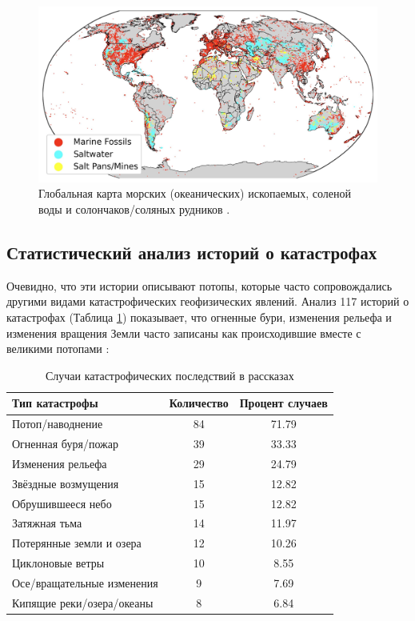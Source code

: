 \documentclass[10pt,twocolumn,letterpaper]{article}
\begin{document}
\begin{figure}[b]
\begin{center}
\includegraphics[width=1\textwidth]{marine.jpg}
\end{center}
   \caption{Глобальная карта морских (океанических) ископаемых, соленой воды и солончаков/соляных рудников \cite{15,16,86,87}.}
\label{fig:2}
\end{figure}

\subsection{Статистический анализ историй о катастрофах}

Очевидно, что эти истории описывают потопы, которые часто сопровождались другими видами катастрофических геофизических явлений. Анализ 117 историй о катастрофах (Таблица \ref{tab: 1}) показывает, что огненные бури, изменения рельефа и изменения вращения Земли часто записаны как происходившие вместе с великими потопами \cite{14}:

\begin{table}[ht]
\begin{center}
\renewcommand{\arraystretch}{1.2}  %
\begin{tabular}{|l|c|c|}
\hline
\textbf{Тип катастрофы} & \textbf{Количество} & \textbf{Процент случаев} \\
\hline\hline
Потоп/наводнение            & 84 & 71.79 \\
Огненная буря/пожар         & 39 & 33.33 \\
Изменения рельефа           & 29 & 24.79 \\
Звёздные возмущения         & 15 & 12.82 \\
Обрушившееся небо           & 15 & 12.82 \\
Затяжная тьма               & 14 & 11.97 \\
Потерянные земли и озера   & 12 & 10.26 \\
Циклоновые ветры           & 10 & 8.55  \\
Осе/вращательные изменения  & 9 & 7.69  \\
Кипящие реки/озера/океаны  & 8 & 6.84 \\
\hline
\end{tabular}
\end{center}
\caption{Случаи катастрофических последствий в рассказах}
\label{tab: 1}
\end{table}
\end{document}
